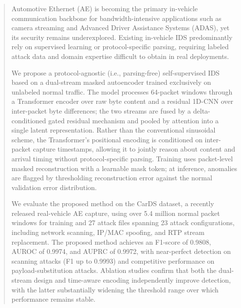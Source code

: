 \begin{abstract}
Automotive Ethernet (AE) is becoming the primary in-vehicle communication backbone for bandwidth-intensive applications such as camera streaming and Advanced Driver Assistance Systems (ADAS), yet its security remains underexplored. Existing in-vehicle IDS predominantly rely on supervised learning or protocol-specific parsing, requiring labeled attack data and domain expertise difficult to obtain in real deployments.

We propose a protocol-agnostic (i.e., parsing-free) self-supervised IDS based on a dual-stream masked autoencoder trained exclusively on unlabeled normal traffic. The model processes 64-packet windows through a Transformer encoder over raw byte content and a residual 1D-CNN over inter-packet byte differences; the two streams are fused by a delta-conditioned gated residual mechanism and pooled by attention into a single latent representation. Rather than the conventional sinusoidal scheme, the Transformer's positional encoding is conditioned on inter-packet capture timestamps, allowing it to jointly reason about content and arrival timing without protocol-specific parsing. Training uses packet-level masked reconstruction with a learnable mask token; at inference, anomalies are flagged by thresholding reconstruction error against the normal validation error distribution.

We evaluate the proposed method on the CarDS dataset, a recently released real-vehicle AE capture, using over 5.4 million normal packet windows for training and 27 attack files spanning 23 attack configurations, including network scanning, IP/MAC spoofing, and RTP stream replacement. The proposed method achieves an F1-score of 0.9808, AUROC of 0.9974, and AUPRC of 0.9972, with near-perfect detection on scanning attacks (F1 up to 0.9993) and competitive performance on payload-substitution attacks. Ablation studies confirm that both the dual-stream design and time-aware encoding independently improve detection, with the latter substantially widening the threshold range over which performance remains stable.
\end{abstract}